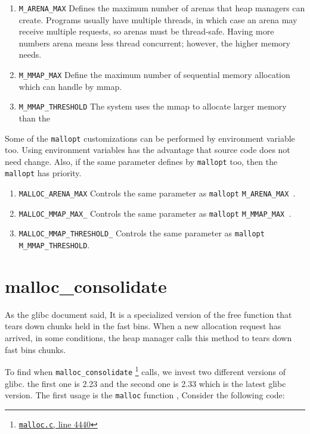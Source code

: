 \documentclass{masterthesis}
\newcommand*\libc{glibc}
\newcommand*\fb{fast bins}
\newcommand*\mallocc{\lstinline{malloc}}
\begin{document}
\begin{enumerate}
\item \lstinline{M_ARENA_MAX} Defines the maximum number of arenas that heap managers can create. Programs usually have multiple threads, in which case an arena may receive multiple requests, so arenas must be thread-safe. Having more numbers arena means less thread concurrent; however, the higher memory needs.

\item \lstinline{M_MMAP_MAX} Define the maximum number of sequential memory allocation which can handle by mmap.

\item \lstinline{M_MMAP_THRESHOLD} The system uses the mmap to allocate larger memory than the
\end{enumerate}

Some of the \lstinline{mallopt} customizations can be performed by environment variable too. Using environment variables has the advantage that source code does not need change. Also, if the same parameter defines by \lstinline{mallopt} too, then the \lstinline{mallopt} has priority. 

\begin{enumerate}
\item \lstinline{MALLOC_ARENA_MAX} Controls the same parameter as \lstinline{mallopt} \lstinline{M_ARENA_MAX }.

\item \lstinline{MALLOC_MMAP_MAX_} Controls the same parameter as  \lstinline{mallopt}  \lstinline{M_MMAP_MAX }.

\item \lstinline{MALLOC_MMAP_THRESHOLD_} Controls the same parameter as \lstinline{mallopt} \lstinline{M_MMAP_THRESHOLD}.
\end{enumerate}

\section{malloc\_consolidate}
As the \libc{} document said, It is a specialized version of the free function that tears down chunks held in the \fb{}. When a new allocation request has arrived, in some conditions, the heap manager calls this method to tears down \fb{} chunks.

To find when \lstinline{malloc_consolidate} \footnote{\href{https://sourceware.org/git/?p=glibc.git;a=blob;f=malloc/malloc.c;h=f7cd29bc2f93e1082ee77800bd64a4b2a2897055;hb=9ea3686266dca3f004ba874745a4087a89682617\#l4440}{\texttt{malloc.c}, line 4440}} calls, we invest two different versions of \libc{}. the first one is 2.23 and the second one is 2.33 which is the latest \libc{} version. The first usage is the \mallocc{} function , Consider the following code:
\end{document}
